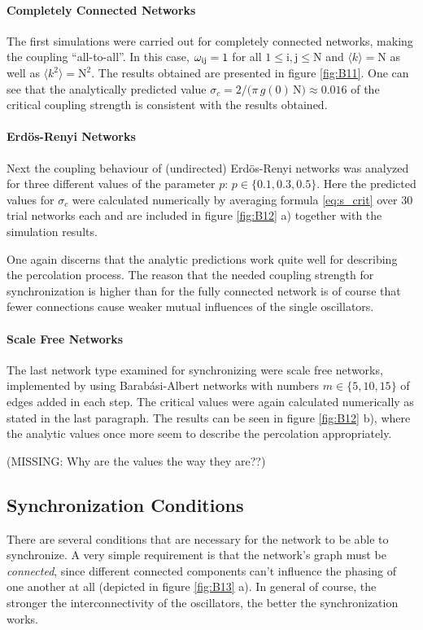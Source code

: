 \documentclass{scrartcl}
\begin{document}
\paragraph{Completely Connected Networks}
The first simulations were carried out for completely connected networks,
making the coupling \enquote{all-to-all}. In this case, $\omega_{\mathrm{ij}} = 1$
for all $1\le \mathrm{i},\mathrm{j}\le \mathrm{N}$ and $\langle k \rangle
= \mathrm{N}$ as well as $\langle k^2 \rangle = \mathrm{N}^2$. The results obtained are
presented in figure \ref{fig:B11}. One can see that the analytically
predicted value $\sigma_c = 2/\big(\pi\,g(0)\,\mathrm{N}\big)\approx 0.016$ of
the critical coupling strength is consistent with the results obtained.

\paragraph{Erdös-Renyi Networks}
Next the coupling behaviour of (undirected) Erdös-Renyi networks was
analyzed for three different values of the parameter $p$: $p\in\{0.1, 0.3, 0.5\}$.
Here the predicted values for $\sigma_c$ were calculated numerically by
averaging formula \eqref{eq:s_crit} over 30 trial networks each and are
included in figure \ref{fig:B12} a) together with the simulation results.

One again discerns that the analytic predictions work quite well for
describing the percolation process.  The reason that the needed coupling
strength for synchronization is higher than for the fully connected network
is of course that fewer connections cause weaker mutual influences of the
single oscillators.

\paragraph{Scale Free Networks}
The last network type examined for synchronizing were scale free networks,
implemented by using Barab\'asi-Albert networks with numbers $m\in\{5, 10,
15\}$ of edges added in each step. The critical values were again
calculated numerically as stated in the last paragraph.  The results can be
seen in figure \ref{fig:B12} b), where the analytic values once more seem
to describe the percolation appropriately.

(MISSING: Why are the values the way they are??)

\subsection{Synchronization Conditions}
There are several conditions that are necessary for the network to be able
to synchronize. A very simple requirement is that the network's graph must
be \emph{connected}, since different connected components can't influence the phasing
of one another at all (depicted in figure \ref{fig:B13} a). In general of
course, the stronger the interconnectivity of the oscillators, the better
the synchronization works. 
\end{document}
